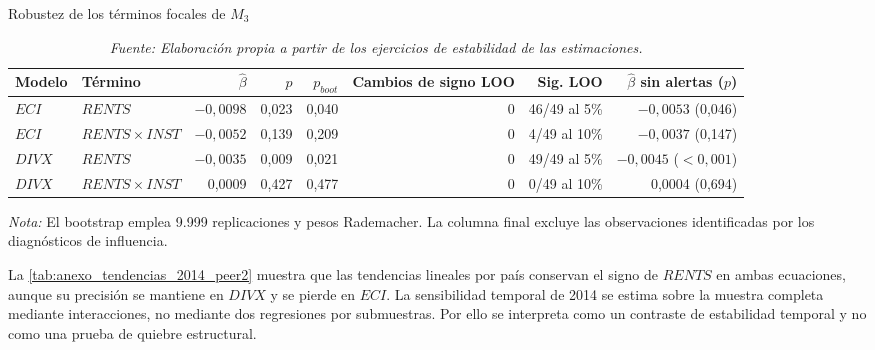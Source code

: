 \documentclass[../../TFM.tex]{subfiles}
\begin{document}
	\begin{table}[htbp]
		\centering
		\footnotesize
		\caption{Robustez de los términos focales de $M_3$}
		\label{tab:anexo_robustez_focal_peer2}
		\begin{adjustbox}{max width=\textwidth}
		\begin{tabular}{llrrrrrr}
			\toprule
			Modelo & Término & $\hat\beta$ & $p$ & $p_{boot}$ & Cambios de signo LOO & Sig. LOO & $\hat\beta$ sin alertas ($p$) \\
			\midrule
			$ECI$ & $RENTS$ & $-0,0098$ & 0,023 & 0,040 & 0 & 46/49 al 5\% & $-0,0053$ (0,046) \\
			$ECI$ & $RENTS\times INST$ & $-0,0052$ & 0,139 & 0,209 & 0 & 4/49 al 10\% & $-0,0037$ (0,147) \\
			$DIVX$ & $RENTS$ & $-0,0035$ & 0,009 & 0,021 & 0 & 49/49 al 5\% & $-0,0045$ ($<0,001$) \\
			$DIVX$ & $RENTS\times INST$ & 0,0009 & 0,427 & 0,477 & 0 & 0/49 al 10\% & 0,0004 (0,694) \\
			\bottomrule
		\end{tabular}
		\end{adjustbox}
		\caption*{\footnotesize \textit{Nota:} El bootstrap emplea 9.999 replicaciones y pesos Rademacher. La columna final excluye las observaciones identificadas por los diagnósticos de influencia.}
		\caption*{\footnotesize \textit{Fuente: Elaboración propia a partir de los ejercicios de estabilidad de las estimaciones.}}
	\end{table}

	La \autoref{tab:anexo_tendencias_2014_peer2} muestra que las tendencias
	lineales por país conservan el signo de $RENTS$ en ambas
	ecuaciones, aunque su precisión se mantiene en $DIVX$ y se pierde en $ECI$.
	La sensibilidad temporal de 2014 se estima sobre la muestra completa mediante
	interacciones, no mediante dos regresiones por submuestras. Por ello se
	interpreta como un contraste de estabilidad temporal y no como una prueba de
	quiebre estructural.
\end{document}
